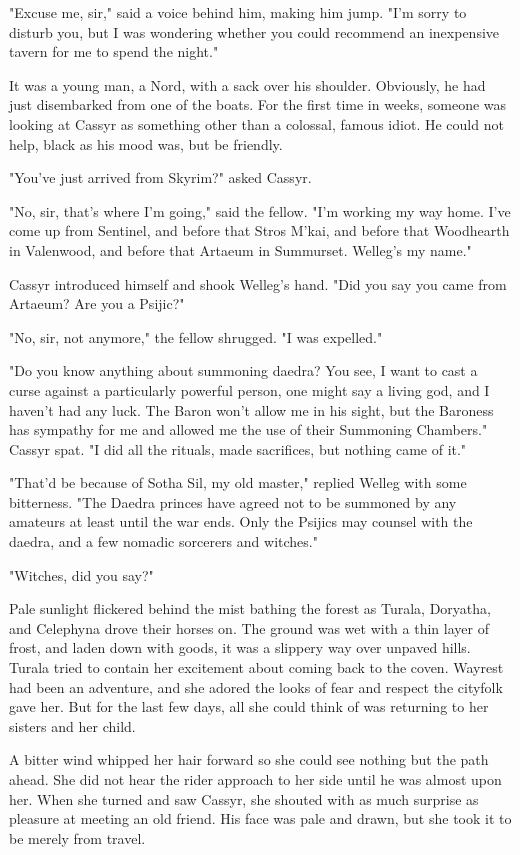 "Excuse me, sir," said a voice behind him, making him jump. "I'm sorry to disturb you, but I was wondering whether you could recommend an inexpensive tavern for me to spend the night."

It was a young man, a Nord, with a sack over his shoulder. Obviously, he had just disembarked from one of the boats. For the first time in weeks, someone was looking at Cassyr as something other than a colossal, famous idiot. He could not help, black as his mood was, but be friendly.

"You've just arrived from Skyrim?" asked Cassyr.

"No, sir, that's where I'm going," said the fellow. "I'm working my way home. I've come up from Sentinel, and before that Stros M'kai, and before that Woodhearth in Valenwood, and before that Artaeum in Summurset. Welleg's my name."

Cassyr introduced himself and shook Welleg's hand. "Did you say you came from Artaeum? Are you a Psijic?"

"No, sir, not anymore," the fellow shrugged. "I was expelled."

"Do you know anything about summoning daedra? You see, I want to cast a curse against a particularly powerful person, one might say a living god, and I haven't had any luck. The Baron won't allow me in his sight, but the Baroness has sympathy for me and allowed me the use of their Summoning Chambers." Cassyr spat. "I did all the rituals, made sacrifices, but nothing came of it."

"That'd be because of Sotha Sil, my old master," replied Welleg with some bitterness. "The Daedra princes have agreed not to be summoned by any amateurs at least until the war ends. Only the Psijics may counsel with the daedra, and a few nomadic sorcerers and witches."

"Witches, did you say?"

Pale sunlight flickered behind the mist bathing the forest as Turala, Doryatha, and Celephyna drove their horses on. The ground was wet with a thin layer of frost, and laden down with goods, it was a slippery way over unpaved hills. Turala tried to contain her excitement about coming back to the coven. Wayrest had been an adventure, and she adored the looks of fear and respect the cityfolk gave her. But for the last few days, all she could think of was returning to her sisters and her child.

A bitter wind whipped her hair forward so she could see nothing but the path ahead. She did not hear the rider approach to her side until he was almost upon her. When she turned and saw Cassyr, she shouted with as much surprise as pleasure at meeting an old friend. His face was pale and drawn, but she took it to be merely from travel.

